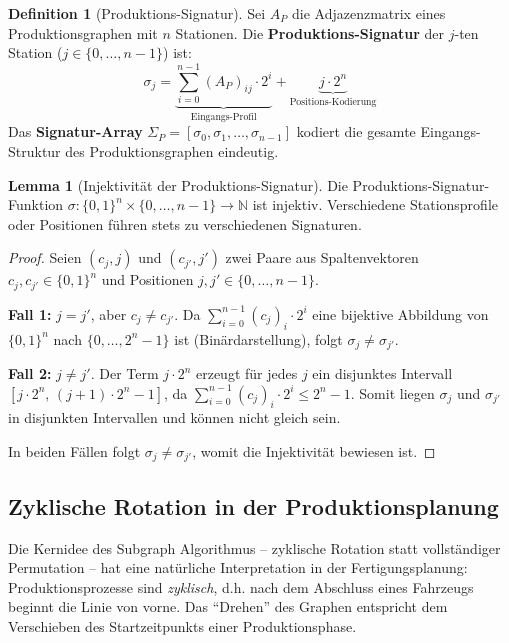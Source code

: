 ﻿\documentclass[a4paper,12pt]{article}
\theoremstyle{definition}
\newtheorem{definition}{Definition}
\newtheorem{lemma}{Lemma}
\begin{document}
\begin{definition}[Produktions-Signatur]
\label{def:signatur}
Sei $A_P$ die Adjazenzmatrix eines Produktionsgraphen mit $n$ Stationen.
Die \textbf{Produktions-Signatur} der $j$-ten Station ($j \in \{0,\ldots,n-1\}$) ist:
\[
\sigma_j = \underbrace{\sum_{i=0}^{n-1} (A_P)_{ij} \cdot 2^i}_{\text{Eingangs-Profil}} + \underbrace{j \cdot 2^n}_{\text{Positions-Kodierung}}
\]
Das \textbf{Signatur-Array} $\Sigma_P = [\sigma_0, \sigma_1, \ldots, \sigma_{n-1}]$ kodiert
die gesamte Eingangs-Struktur des Produktionsgraphen eindeutig.
\end{definition}

\begin{lemma}[Injektivität der Produktions-Signatur]
\label{lem:injektivitaet}
Die Produktions-Signatur-Funktion $\sigma: \{0,1\}^n \times \{0,\ldots,n-1\} \to \mathbb{N}$
ist injektiv. Verschiedene Stationsprofile oder Positionen führen stets zu verschiedenen Signaturen.
\end{lemma}

\begin{proof}
Seien $(c_j, j)$ und $(c_{j'}, j')$ zwei Paare aus Spaltenvektoren $c_j, c_{j'} \in \{0,1\}^n$
und Positionen $j, j' \in \{0,\ldots,n-1\}$.

\textbf{Fall 1:} $j = j'$, aber $c_j \neq c_{j'}$. Da $\sum_{i=0}^{n-1} (c_j)_i \cdot 2^i$
eine bijektive Abbildung von $\{0,1\}^n$ nach $\{0,\ldots,2^n-1\}$ ist (Binärdarstellung),
folgt $\sigma_j \neq \sigma_{j'}$.

\textbf{Fall 2:} $j \neq j'$. Der Term $j \cdot 2^n$ erzeugt für jedes $j$ ein disjunktes Intervall
$[j \cdot 2^n,\, (j+1) \cdot 2^n - 1]$, da $\sum_{i=0}^{n-1} (c_j)_i \cdot 2^i \leq 2^n - 1$.
Somit liegen $\sigma_j$ und $\sigma_{j'}$ in disjunkten Intervallen und können nicht gleich sein.

In beiden Fällen folgt $\sigma_j \neq \sigma_{j'}$, womit die Injektivität bewiesen ist.
\end{proof}

\subsection{Zyklische Rotation in der Produktionsplanung}

Die Kernidee des Subgraph Algorithmus -- zyklische Rotation statt vollständiger Permutation --
hat eine natürliche Interpretation in der Fertigungsplanung: Produktionsprozesse sind
\emph{zyklisch}, d.h. nach dem Abschluss eines Fahrzeugs beginnt die Linie von vorne.
Das ``Drehen'' des Graphen entspricht dem Verschieben des Startzeitpunkts einer Produktionsphase.
\end{document}
